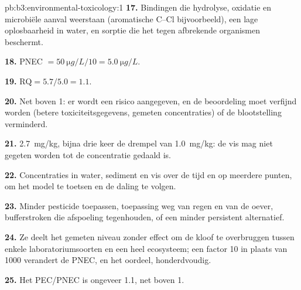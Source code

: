 \begin{solution}{pb:b3:environmental-toxicology:1}
\textbf{17.} Bindingen die hydrolyse, oxidatie en microbiële aanval
weerstaan (aromatische C--Cl bijvoorbeeld), een lage oplosbaarheid in
water, en sorptie die het tegen afbrekende organismen beschermt.

\textbf{18.} PNEC $= \qty{50}{\micro g/L}/10 = \qty{5.0}{\micro g/L}$.

\textbf{19.} $\mathrm{RQ} = 5.7/5.0 = 1.1$.

\textbf{20.} Net boven 1: er wordt een risico aangegeven, en de
beoordeling moet verfijnd worden (betere toxiciteitsgegevens, gemeten
concentraties) of de blootstelling verminderd.

\textbf{21.} \qty{2.7}{mg/kg}, bijna drie keer de drempel van \qty{1.0}{mg/kg}: de vis mag niet gegeten worden
tot de concentratie gedaald is.

\textbf{22.} Concentraties in water, sediment en vis over de tijd en op
meerdere punten, om het model te toetsen en de daling te volgen.

\textbf{23.} Minder pesticide toepassen, toepassing weg van regen en van
de oever, bufferstroken die afspoeling tegenhouden, of een minder
persistent alternatief.

\textbf{24.} Ze deelt het gemeten niveau zonder effect om de kloof te
overbruggen tussen enkele laboratoriumsoorten en een heel ecosysteem;
een factor 10 in plaats van 1000 verandert de PNEC, en het oordeel,
honderdvoudig.

\textbf{25.} Het  PEC/PNEC is ongeveer 1.1, net boven 1.
\end{solution}

